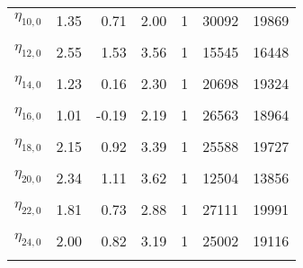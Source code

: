 \begin{table}
\begin{tabular}[t]{lrrrrrr}
$\eta_{10,  0}$ & 1.35 & 0.71 & 2.00 & 1 & 30092 & 19869\\
\cellcolor{gray!6}{$\eta_{11,  0}$} & \cellcolor{gray!6}{2.20} & \cellcolor{gray!6}{1.41} & \cellcolor{gray!6}{2.99} & \cellcolor{gray!6}{1} & \cellcolor{gray!6}{26539} & \cellcolor{gray!6}{21003}\\
$\eta_{12,  0}$ & 2.55 & 1.53 & 3.56 & 1 & 15545 & 16448\\
\cellcolor{gray!6}{$\eta_{13,  0}$} & \cellcolor{gray!6}{2.21} & \cellcolor{gray!6}{1.29} & \cellcolor{gray!6}{3.13} & \cellcolor{gray!6}{1} & \cellcolor{gray!6}{27142} & \cellcolor{gray!6}{19730}\\
$\eta_{14,  0}$ & 1.23 & 0.16 & 2.30 & 1 & 20698 & 19324\\
\cellcolor{gray!6}{$\eta_{15,  0}$} & \cellcolor{gray!6}{1.11} & \cellcolor{gray!6}{0.21} & \cellcolor{gray!6}{2.02} & \cellcolor{gray!6}{1} & \cellcolor{gray!6}{27804} & \cellcolor{gray!6}{20001}\\
$\eta_{16,  0}$ & 1.01 & -0.19 & 2.19 & 1 & 26563 & 18964\\
\cellcolor{gray!6}{$\eta_{17,  0}$} & \cellcolor{gray!6}{1.62} & \cellcolor{gray!6}{0.76} & \cellcolor{gray!6}{2.48} & \cellcolor{gray!6}{1} & \cellcolor{gray!6}{29577} & \cellcolor{gray!6}{20050}\\
$\eta_{18,  0}$ & 2.15 & 0.92 & 3.39 & 1 & 25588 & 19727\\
\cellcolor{gray!6}{$\eta_{19,  0}$} & \cellcolor{gray!6}{1.53} & \cellcolor{gray!6}{0.78} & \cellcolor{gray!6}{2.28} & \cellcolor{gray!6}{1} & \cellcolor{gray!6}{23475} & \cellcolor{gray!6}{19586}\\
$\eta_{20,  0}$ & 2.34 & 1.11 & 3.62 & 1 & 12504 & 13856\\
\cellcolor{gray!6}{$\eta_{21,  0}$} & \cellcolor{gray!6}{3.13} & \cellcolor{gray!6}{2.27} & \cellcolor{gray!6}{3.99} & \cellcolor{gray!6}{1} & \cellcolor{gray!6}{24809} & \cellcolor{gray!6}{19186}\\
$\eta_{22,  0}$ & 1.81 & 0.73 & 2.88 & 1 & 27111 & 19991\\
\cellcolor{gray!6}{$\eta_{23,  0}$} & \cellcolor{gray!6}{2.22} & \cellcolor{gray!6}{0.92} & \cellcolor{gray!6}{3.53} & \cellcolor{gray!6}{1} & \cellcolor{gray!6}{22125} & \cellcolor{gray!6}{19863}\\
$\eta_{24,  0}$ & 2.00 & 0.82 & 3.19 & 1 & 25002 & 19116\\
\cellcolor{gray!6}{$\eta_{25,  0}$} & \cellcolor{gray!6}{2.97} & \cellcolor{gray!6}{1.93} & \cellcolor{gray!6}{4.00} & \cellcolor{gray!6}{1} & \cellcolor{gray!6}{17267} & \cellcolor{gray!6}{18883}\\

\end{tabular}
\end{table}
